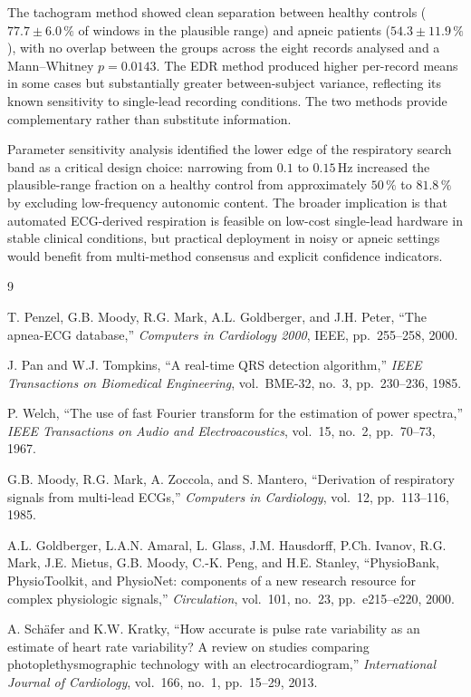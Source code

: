 \documentclass[11pt,a4paper]{article}
\begin{document}
The tachogram method showed clean separation between healthy controls ($77.7 \pm 6.0\,\%$ of windows in the plausible range) and apneic patients ($54.3 \pm 11.9\,\%$), with no overlap between the groups across the eight records analysed and a Mann--Whitney $p = 0.0143$. The EDR method produced higher per-record means in some cases but substantially greater between-subject variance, reflecting its known sensitivity to single-lead recording conditions. The two methods provide complementary rather than substitute information.

Parameter sensitivity analysis identified the lower edge of the respiratory search band as a critical design choice: narrowing from $0.1$ to $0.15$\,Hz increased the plausible-range fraction on a healthy control from approximately $50\,\%$ to $81.8\,\%$ by excluding low-frequency autonomic content. The broader implication is that automated ECG-derived respiration is feasible on low-cost single-lead hardware in stable clinical conditions, but practical deployment in noisy or apneic settings would benefit from multi-method consensus and explicit confidence indicators.

\begin{thebibliography}{9}

T. Penzel, G.B. Moody, R.G. Mark, A.L. Goldberger, and J.H. Peter,
``The apnea-ECG database,''
\textit{Computers in Cardiology 2000}, IEEE, pp.~255--258, 2000.

J. Pan and W.J. Tompkins,
``A real-time QRS detection algorithm,''
\textit{IEEE Transactions on Biomedical Engineering}, vol.~BME-32,
no.~3, pp.~230--236, 1985.

P. Welch,
``The use of fast Fourier transform for the estimation of power spectra,''
\textit{IEEE Transactions on Audio and Electroacoustics}, vol.~15,
no.~2, pp.~70--73, 1967.

G.B. Moody, R.G. Mark, A. Zoccola, and S. Mantero,
``Derivation of respiratory signals from multi-lead ECGs,''
\textit{Computers in Cardiology}, vol.~12, pp.~113--116, 1985.

A.L. Goldberger, L.A.N. Amaral, L. Glass, J.M. Hausdorff, P.Ch. Ivanov, R.G. Mark, J.E. Mietus, G.B. Moody, C.-K. Peng, and H.E. Stanley,
``PhysioBank, PhysioToolkit, and PhysioNet: components of a new research resource for complex physiologic signals,''
\textit{Circulation}, vol.~101, no.~23, pp.~e215--e220, 2000.

A. Sch\"afer and K.W. Kratky,
``How accurate is pulse rate variability as an estimate of heart rate variability? A review on studies comparing photoplethysmographic technology with an electrocardiogram,''
\textit{International Journal of Cardiology}, vol.~166, no.~1, pp.~15--29, 2013.

\end{thebibliography}
\end{document}
